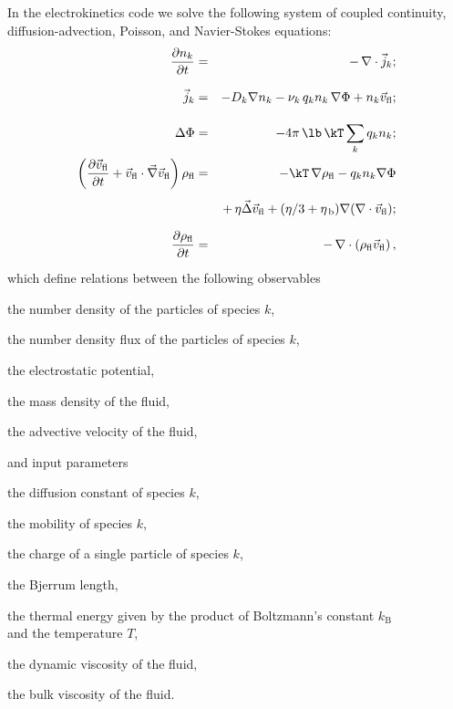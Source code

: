 In the electrokinetics code we solve the following system of coupled continuity,
diffusion-advection, Poisson, and Navier-Stokes equations:
\begin{eqnarray}
\label{eq:ek-model-continuity} \frac{\partial n_k}{\partial t} & = & -\, \nabla \cdot \vec{j}_k \vphantom{\left(\frac{\partial}{\partial}\right)} ; \\
\label{eq:ek-model-fluxes} \vec{j}_{k} & = & -D_k \nabla n_k - \nu_k \, q_k n_k\, \nabla \Phi + n_k \vec{v}_{\mathrm{fl}} \vphantom{\left(\frac{\partial}{\partial}\right)} ; \\
\label{eq:ek-model-poisson} \Delta \Phi & = & -4 \pi \, \lb \, \kT \sum_k q_k n_k \vphantom{\left(\frac{\partial}{\partial}\right)}; \\
\nonumber \left(\frac{\partial \vec{v}_{\mathrm{fl}}}{\partial t} + \vec{v}_{\mathrm{fl}} \cdot \vec{\nabla} \vec{v}_{\mathrm{fl}} \right) \rho_\mathrm{fl} & = & -\kT \, \nabla \rho_\mathrm{fl} - q_k n_k \nabla \Phi \\
\label{eq:ek-model-velocity} & & +\, \eta \vec{\Delta} \vec{v}_{\mathrm{fl}} + (\eta / 3 + \eta_{\text{\,b}}) \nabla (\nabla \cdot \vec{v}_{\mathrm{fl}}) \vphantom{\left(\frac{\partial}{\partial}\right)} ; \\
\label{eq:ek-model-continuity-fl} \frac{\partial \rho_\mathrm{fl}}{\partial t} & = & -\,\nabla\cdot\left( \rho_\mathrm{fl} \vec{v}_{\mathrm{fl}} \right) \vphantom{\left(\frac{\partial}{\partial}\right)} , 
\end{eqnarray}
which define relations between the following observables
\begin{description}[itemsep=0cm,labelindent=1.5em,leftmargin=4.5em,style=nextline]
  \item[$n_k$] the number density of the particles of species $k$,
  \item[$\vec{j}_k$] the number density flux of the particles of species $k$,
  \item[$\Phi$] the electrostatic potential,
  \item[$\rho_{\mathrm{fl}}$] the mass density of the fluid,
  \item[$\vec{v}_{\mathrm{fl}}$] the advective velocity of the fluid,
\end{description}
and input parameters
\begin{description}[itemsep=0cm,labelindent=1.5em,leftmargin=4.5em,style=nextline]
  \item[$D_k$] the diffusion constant of species $k$,
  \item[$\nu_k$] the mobility of species $k$,
  \item[$q_k$] the charge of a single particle of species $k$,
  \item[$\lb$] the Bjerrum length,
  \item[$\kT$] the thermal energy given by the product of Boltzmann's constant
  $k_\text{B}$\\and the temperature $T$,
  \item[$\eta$] the dynamic viscosity of the fluid,
  \item[$\eta_{\text{\,b}}$] the bulk viscosity of the fluid.
\end{description}
